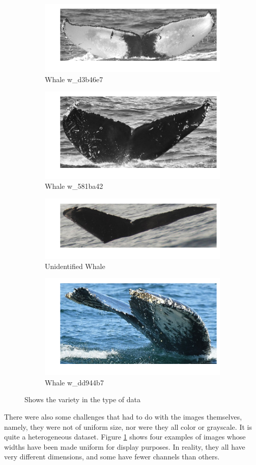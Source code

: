 \begin{figure}[h!]
	\begin{subfigure}{.5\textwidth}
		\includegraphics[width=.7\linewidth]{images/w_d3b46e7.png}
		\caption{Whale w\_d3b46e7}
	\end{subfigure}
	\begin{subfigure}{.5\textwidth}
		\includegraphics[width=.7\linewidth]{images/w_581ba42.png}
		\caption{Whale w\_581ba42}
	\end{subfigure}
	\begin{subfigure}{.5\textwidth}
		\includegraphics[width=.7\linewidth]{images/new_whale.png}
		\caption{Unidentified Whale}
	\end{subfigure}
	\begin{subfigure}{.5\textwidth}
		\includegraphics[width=.7\linewidth]{images/w_dd944b7.png}
		\caption{Whale w\_dd944b7}
	\end{subfigure}
	\caption{\label{fig:whale}Shows the variety in the type of data}
\end{figure}

There were also some challenges that had to do with the images themselves, namely, they were not of uniform size, nor were they all color or grayscale. It is quite a heterogeneous dataset. Figure \ref{fig:whale} shows four examples of images whose widths have been made uniform for display purposes. In reality, they all have very different dimensions, and some have fewer channels than others.\\

